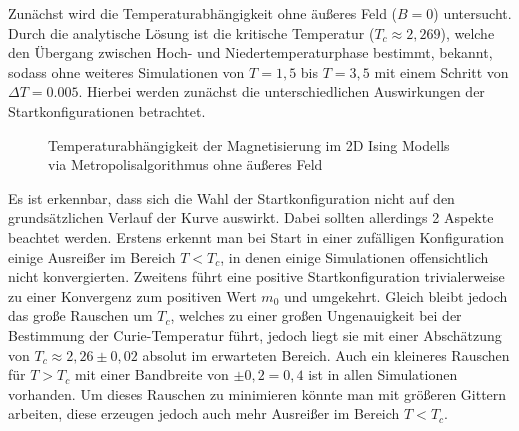 Zunächst wird die Temperaturabhängigkeit ohne äußeres Feld ($B=0$) untersucht. Durch die analytische Lösung ist die kritische Temperatur ($T_{c}\approx 2,269$), welche den Übergang zwischen Hoch- und Niedertemperaturphase bestimmt, bekannt, sodass ohne weiteres Simulationen von $T=1,5$ bis $T=3,5$ mit einem Schritt von $\Delta T = 0.005$. Hierbei werden zunächst die unterschiedlichen Auswirkungen der Startkonfigurationen betrachtet.
\begin{figure}[H]
	\centering
	\caption{Temperaturabhängigkeit der Magnetisierung im 2D Ising Modells via Metropolisalgorithmus ohne äußeres Feld}
	\label{mp2d0modes}
\end{figure}
Es ist erkennbar, dass sich die Wahl der Startkonfiguration nicht auf den grundsätzlichen Verlauf der Kurve auswirkt. Dabei sollten allerdings 2 Aspekte beachtet werden. Erstens erkennt man bei Start in einer zufälligen Konfiguration einige Ausreißer im Bereich $T<T_{c}$, in denen einige Simulationen offensichtlich nicht konvergierten. Zweitens führt eine positive Startkonfiguration trivialerweise zu einer Konvergenz zum positiven Wert $m_{0}$ und umgekehrt. Gleich bleibt jedoch das große Rauschen um $T_{c}$, welches zu einer großen Ungenauigkeit bei der Bestimmung der Curie-Temperatur führt, jedoch liegt sie mit einer Abschätzung von $T_{c}\approx 2,26\pm 0,02$ absolut im erwarteten Bereich. Auch ein kleineres Rauschen für $T>T_{c}$ mit einer Bandbreite von $\pm 0,2 = 0,4$ ist in allen Simulationen vorhanden. Um dieses Rauschen zu minimieren könnte man mit größeren Gittern arbeiten, diese erzeugen jedoch auch mehr Ausreißer im Bereich $T<T_{c}$.



